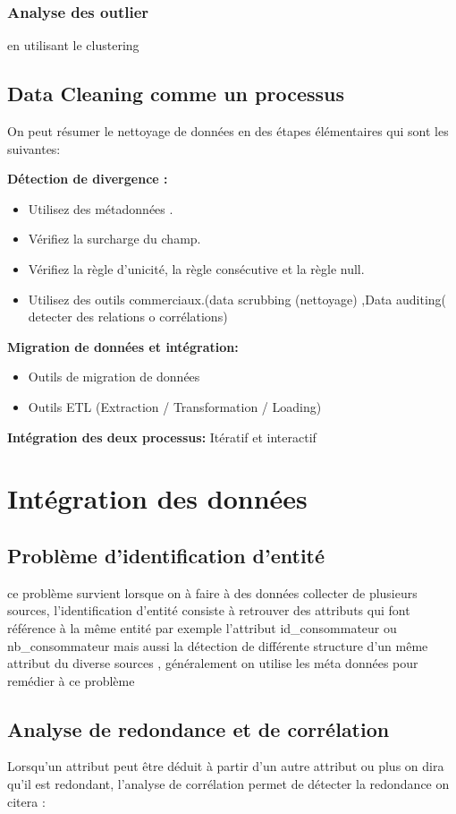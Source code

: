 \documentclass[12pt,a4paper,oneside]{book}
\begin{document}
    \subsubsection{Analyse des outlier}
     en utilisant le clustering 
     \subsection{Data Cleaning comme un processus}
     On peut résumer le nettoyage de données en des étapes élémentaires qui sont les suivantes:
     
    \textbf{ Détection de divergence : }
 \begin{itemize}
\item Utilisez des métadonnées .
\item Vérifiez la surcharge du champ.
\item Vérifiez la règle d'unicité, la règle consécutive et la règle null.
\item Utilisez des outils commerciaux.(data scrubbing (nettoyage) ,Data auditing( detecter des relations o corrélations)
  
   \end{itemize}
	\textbf{ Migration de données et intégration:}
 \begin{itemize}
 \item Outils de migration de données
 \item Outils ETL (Extraction / Transformation / Loading)
 \end{itemize}
\textbf{ Intégration des deux processus:}
 Itératif et interactif 

    \section{Intégration des données}
    \subsection{Problème d'identification d'entité}
     ce problème survient lorsque on à faire à des données collecter de plusieurs sources, l'identification d'entité consiste à retrouver des attributs  qui font référence à la même entité par exemple l'attribut id\_consommateur ou nb\_consommateur mais aussi la détection de différente structure d'un même attribut du diverse sources , généralement on utilise les méta données pour remédier à ce problème
    \subsection{Analyse de redondance et de corrélation}
     Lorsqu'un attribut peut être déduit à partir d'un autre attribut ou plus on dira qu'il est redondant, l'analyse de corrélation permet  de détecter la redondance  on citera :
\end{document}
